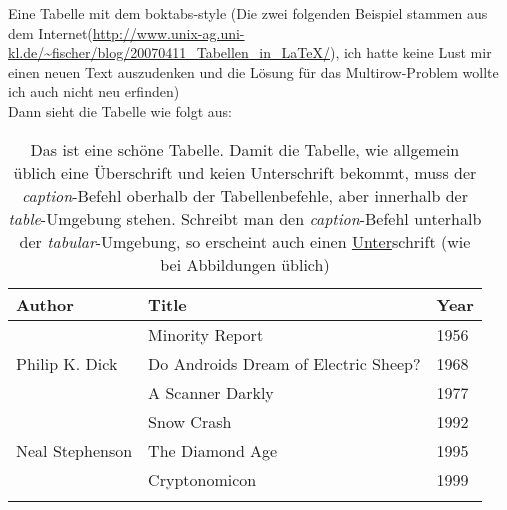 Eine Tabelle mit dem boktabs-style (Die zwei folgenden Beispiel stammen aus dem Internet\linebreak (\url{http://www.unix-ag.uni-kl.de/~fischer/blog/20070411_Tabellen_in_LaTeX/}), ich hatte keine Lust mir einen neuen Text auszudenken und die Lösung für das Multirow-Problem wollte ich auch nicht neu erfinden)\\[1.5ex] %
Dann sieht die Tabelle wie folgt aus:
	
	\begin{table}[H] %
		\caption[Schöne Tabelle]	{Das ist eine schöne Tabelle. Damit die Tabelle, wie allgemein üblich eine Überschrift und keien Unterschrift bekommt, 
															 muss der \emph{caption}-Befehl oberhalb der Tabellenbefehle, aber innerhalb der \emph{table}-Umgebung stehen. 
															 Schreibt man den \emph{caption}-Befehl unterhalb der \emph{tabular}-Umgebung, so erscheint auch einen \underline{Unter}schrift 
															 (wie bei Abbildungen üblich)}
		\begin{center} %
			\begin{tabular}{lll}
				\toprule
					Author & Title & Year 
				\\ \midrule
					\multirow{3}{*}{Philip K. Dick} & Minority Report & 1956 
				\\ \cmidrule{2-3}
		 			& Do Androids Dream of Electric Sheep? & 1968 
				\\ \cmidrule{2-3}
		 			& A Scanner Darkly & 1977 
				\\ \midrule
					\multirow{3}{*}{Neal Stephenson} & Snow Crash & 1992 
				\\ \cmidrule{2-3}
		 			& The Diamond Age & 1995
				\\ \cmidrule{2-3}
		 			& Cryptonomicon & 1999
				\\ \bottomrule\\
			\end{tabular}
		\end{center}
	\end{table} 
	
